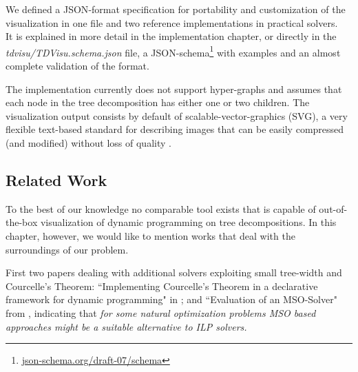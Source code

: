 \documentclass[a4paper, 12pt, bibliography=totoc]{scrartcl}
\begin{document}
We defined a {JSON}-format specification for portability and customization of the visualization in one file and two reference implementations in practical solvers.\\
It is explained in more detail in the implementation chapter, or directly in the \textit{tdvisu/TDVisu.schema.json} file, a JSON-schema\footnote{\url{json-schema.org/draft-07/schema}} with examples and an almost complete validation of the format.

The implementation currently does not support hyper-graphs and assumes that each node in the tree decomposition has either one or two children.
The visualization output consists by default of scalable-vector-graphics (SVG), a very flexible text-based standard for describing images that can be easily compressed (and modified) without loss of quality \cite{SVGMozilla}.



\subsection{Related Work}

To the best of our knowledge no comparable tool exists that is capable of out-of-the-box visualization of dynamic programming on tree decompositions.
In this chapter, however, we would like to mention works that deal with the surroundings of our problem.

First two papers dealing with additional solvers exploiting small tree-width and Courcelle's Theorem:
	``Implementing Courcelle's Theorem in a declarative framework for dynamic programming" in \cite{ImplCourcelleDP16};
	and
	``Evaluation of an MSO-Solver" from \cite{evaluationMSO}, indicating that \textit{for some natural optimization problems MSO based approaches might be a suitable alternative to ILP solvers.
	}
\end{document}
